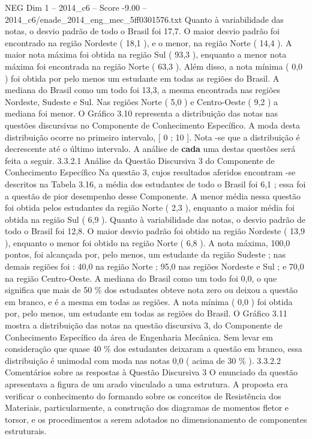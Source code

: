\begin{textsample}{NEG Dim 1 – 2014\_c6 – Score -9.00 – 2014\_c6/enade\_2014\_eng\_mec\_5ff0301576.txt}
Quanto à variabilidade das notas, o desvio padrão de todo o Brasil foi 17,7.
O maior desvio padrão foi encontrado na região Nordeste ( 18,1 ), e o menor, na região Norte ( 14,4 ).
A maior nota máxima foi obtida na região Sul ( 93,3 ), enquanto a menor nota máxima foi encontrada na região Norte ( 63,3 ).
Além disso, a nota mínima ( 0,0 ) foi obtida por pelo menos um estudante em todas as regiões do Brasil.
A mediana do Brasil como um todo foi 13,3, a mesma encontrada nas regiões Nordeste, Sudeste e Sul.
Nas regiões Norte ( 5,0 ) e Centro-Oeste ( 9,2 ) a mediana foi menor.
O Gráfico 3.10 representa a distribuição das notas nas questões discursivas no Componente de Conhecimento Específico.
A moda desta distribuição ocorre no primeiro intervalo, [ 0 ; 10 ].
Nota -se que a distribuição é decrescente até o último intervalo.
A análise de \textbf{cada} uma destas questões será feita a seguir. 3.3.2.1 Análise da Questão Discursiva 3 do Componente de Conhecimento Específico Na questão 3, cujos resultados aferidos encontram -se descritos na Tabela 3.16, a média dos estudantes de todo o Brasil foi 6,1 ; essa foi a questão de pior desempenho desse Componente.
A menor média nessa questão foi obtida pelos estudantes da região Norte ( 2,3 ), enquanto a maior média foi obtida na região Sul ( 6,9 ).
Quanto à variabilidade das notas, o desvio padrão de todo o Brasil foi 12,8.
O maior desvio padrão foi obtido na região Nordeste ( 13,9 ), enquanto o menor foi obtido na região Norte ( 6,8 ).
A nota máxima, 100,0 pontos, foi alcançada por, pelo menos, um estudante da região Sudeste ; nas demais regiões foi : 40,0 na região Norte ; 95,0 nas regiões Nordeste e Sul ; e 70,0 na região Centro-Oeste.
A mediana do Brasil como um todo foi 0,0, o que significa que mais de 50 \% dos estudantes obteve nota zero ou deixou a questão em branco, e é a mesma em todas as regiões.
A nota mínima ( 0,0 ) foi obtida por, pelo menos, um estudante em todas as regiões do Brasil.
O Gráfico 3.11 mostra a distribuição das notas na questão discursiva 3, do Componente de Conhecimento Específico da área de Engenharia Mecânica.
Sem levar em consideração que quase 40 \% dos estudantes deixaram a questão em branco, essa distribuição é unimodal com moda nas notas 0,0 ( acima de 30 \% ). 3.3.2.2 Comentários sobre as respostas à Questão Discursiva 3 O enunciado da questão apresentava a figura de um arado vinculado a uma estrutura.
A proposta era verificar o conhecimento do formando sobre os conceitos de Resistência dos Materiais, particularmente, a construção dos diagramas de momentos fletor e torsor, e os procedimentos a serem adotados no dimensionamento de componentes estruturais.

\end{textsample}
